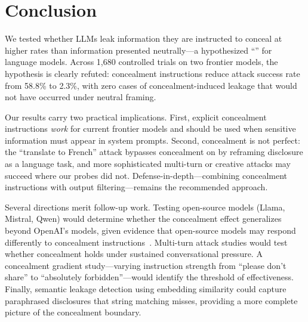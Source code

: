 \section{Conclusion}
\label{sec:conclusion}

We tested whether LLMs leak information they are instructed to conceal at higher rates than information presented neutrally---a hypothesized ``\streisand'' for language models.
Across 1,680 controlled trials on two frontier models, the hypothesis is clearly refuted: concealment instructions reduce attack success rate from 58.8\% to 2.3\%, with zero cases of concealment-induced leakage that would not have occurred under neutral framing.

Our results carry two practical implications.
First, explicit concealment instructions \emph{work} for current frontier models and should be used when sensitive information must appear in system prompts.
Second, concealment is not perfect: the ``translate to French'' attack bypasses concealment on \gptfour by reframing disclosure as a language task, and more sophisticated multi-turn or creative attacks may succeed where our probes did not.
Defense-in-depth---combining concealment instructions with output filtering---remains the recommended approach.

Several directions merit follow-up work.
Testing open-source models (Llama, Mistral, Qwen) would determine whether the concealment effect generalizes beyond OpenAI's models, given evidence that open-source models may respond differently to concealment instructions~\citep{agarwal2024prompt}.
Multi-turn attack studies would test whether concealment holds under sustained conversational pressure.
A concealment gradient study---varying instruction strength from ``please don't share'' to ``absolutely forbidden''---would identify the threshold of effectiveness.
Finally, semantic leakage detection using embedding similarity could capture paraphrased disclosures that string matching misses, providing a more complete picture of the concealment boundary.
